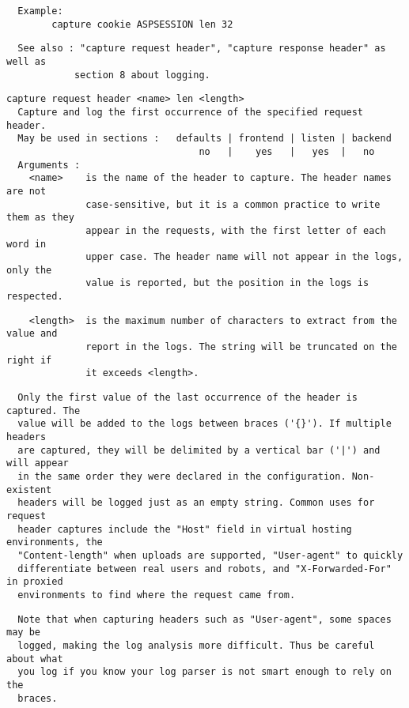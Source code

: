 \begin{verbatim}
  Example:
        capture cookie ASPSESSION len 32
\end{verbatim}

\begin{verbatim}
  See also : "capture request header", "capture response header" as well as
            section 8 about logging.
\end{verbatim}

\begin{verbatim}
capture request header <name> len <length>
  Capture and log the first occurrence of the specified request header.
  May be used in sections :   defaults | frontend | listen | backend
                                  no   |    yes   |   yes  |   no
  Arguments :
    <name>    is the name of the header to capture. The header names are not
              case-sensitive, but it is a common practice to write them as they
              appear in the requests, with the first letter of each word in
              upper case. The header name will not appear in the logs, only the
              value is reported, but the position in the logs is respected.
\end{verbatim}

\begin{verbatim}
    <length>  is the maximum number of characters to extract from the value and
              report in the logs. The string will be truncated on the right if
              it exceeds <length>.
\end{verbatim}

\begin{verbatim}
  Only the first value of the last occurrence of the header is captured. The
  value will be added to the logs between braces ('{}'). If multiple headers
  are captured, they will be delimited by a vertical bar ('|') and will appear
  in the same order they were declared in the configuration. Non-existent
  headers will be logged just as an empty string. Common uses for request
  header captures include the "Host" field in virtual hosting environments, the
  "Content-length" when uploads are supported, "User-agent" to quickly
  differentiate between real users and robots, and "X-Forwarded-For" in proxied
  environments to find where the request came from.
\end{verbatim}

\begin{verbatim}
  Note that when capturing headers such as "User-agent", some spaces may be
  logged, making the log analysis more difficult. Thus be careful about what
  you log if you know your log parser is not smart enough to rely on the
  braces.
\end{verbatim}

